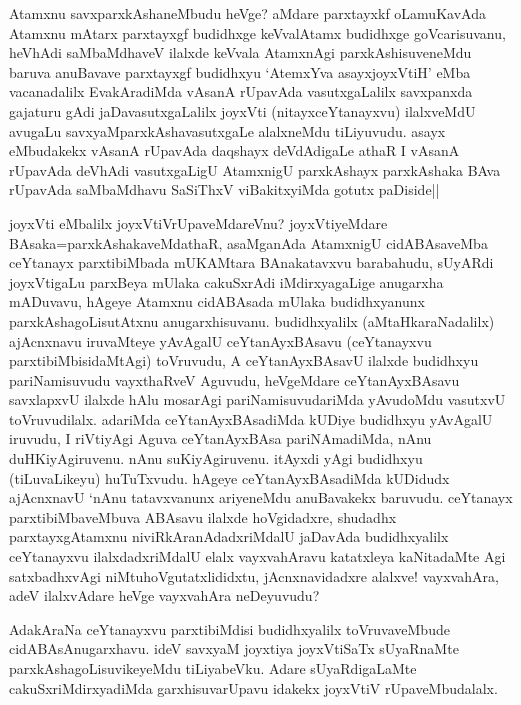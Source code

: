 \begin{artha}%
Atamxnu savxparxkAshaneMbudu heVge? aMdare parxtayxkf oLamuKavAda Atamxnu mAtarx parxtayxgf budidhxge keVvalAtamx budidhxge goVcarisuvanu, heVhAdi saMbaMdhaveV ilalxde keVvala AtamxnAgi parxkAshisuveneMdu baruva anuBavave parxtayxgf budidhxyu `AtemxYva asayxjoyxVtiH' eMba vacanadalilx EvakAradiMda vAsanA rUpavAda vasutxgaLalilx savxpanxda gajaturu gAdi jaDavasutxgaLalilx joyxVti (nitayxceYtanayxvu) ilalxveMdU avugaLu savxyaMparxkAshavasutxgaLe alalxneMdu tiLiyuvudu. asayx eMbudakekx vAsanA rUpavAda daqshayx deVdAdigaLe athaR I vAsanA rUpavAda deVhAdi vasutxgaLigU AtamxnigU parxkAshayx parxkAshaka BAva rUpavAda saMbaMdhavu SaSiThxV viBakitxyiMda gotutx paDiside||
\end{artha}

\begin{artha}
joyxVti eMbalilx joyxVtiVrUpaveMdareVnu? joyxVtiyeMdare BAsaka=parxkAshakaveMdathaR, asaMganAda AtamxnigU cidABAsaveMba ceYtanayx parxtibiMbada mUKAMtara BAnakatavxvu barabahudu, sUyARdi joyxVtigaLu parxBeya mUlaka cakuSxrAdi iMdirxyagaLige anugarxha mADuvavu, hAgeye Atamxnu cidABAsada mUlaka budidhxyanunx parxkAshagoLisutAtxnu anugarxhisuvanu. budidhxyalilx (aMtaHkaraNadalilx) ajAcnxnavu iruvaMteye yAvAgalU ceYtanAyxBAsavu (ceYtanayxvu parxtibiMbisidaMtAgi) toVruvudu, A ceYtanAyxBAsavU ilalxde budidhxyu pariNamisuvudu vayxthaRveV Aguvudu, heVgeMdare ceYtanAyxBAsavu savxlapxvU ilalxde hAlu mosarAgi pariNamisuvudariMda yAvudoMdu vasutxvU toVruvudilalx. adariMda ceYtanAyxBAsadiMda kUDiye budidhxyu yAvAgalU iruvudu, I riVtiyAgi Aguva ceYtanAyxBAsa pariNAmadiMda, nAnu duHKiyAgiruvenu. nAnu suKiyAgiruvenu. itAyxdi yAgi budidhxyu (tiLuvaLikeyu) huTuTxvudu. hAgeye ceYtanAyxBAsadiMda kUDidudx ajAcnxnavU `nAnu tatavxvanunx ariyeneMdu anuBavakekx baruvudu. ceYtanayx parxtibiMbaveMbuva ABAsavu ilalxde hoVgidadxre, shudadhx parxtayxgAtamxnu niviRkAranAdadxriMdalU jaDavAda budidhxyalilx ceYtanayxvu ilalxdadxriMdalU elalx vayxvahAravu katatxleya kaNitadaMte Agi satxbadhxvAgi niMtuhoVgutatxlididxtu, jAcnxnavidadxre alalxve! vayxvahAra, adeV ilalxvAdare heVge vayxvahAra neDeyuvudu?  
\end{artha}%

\begin{artha}
AdakAraNa ceYtanayxvu parxtibiMdisi budidhxyalilx toVruvaveMbude cidABAsAnugarxhavu. ideV savxyaM joyxtiya joyxVtiSaTx sUyaRnaMte parxkAshagoLisuvikeyeMdu tiLiyabeVku. Adare sUyaRdigaLaMte cakuSxriMdirxyadiMda garxhisuvarUpavu idakekx joyxVtiV rUpaveMbudalalx. 
\end{artha}

